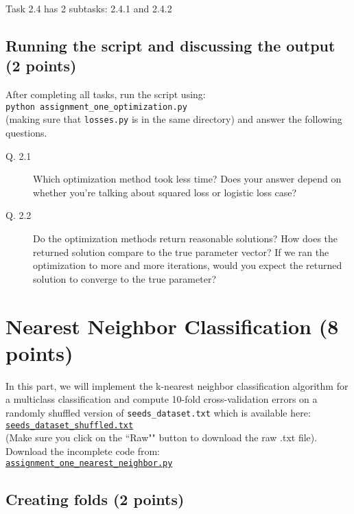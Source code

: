 \documentclass{article}
\begin{document}
Task 2.4 has 2 subtasks: 2.4.1 and 2.4.2

\subsection{Running the script and discussing the output (2 points)}

After completing all tasks, run the script using:\\
{\tt python assignment\_one\_optimization.py} \\
(making sure that {\tt losses.py} is in the same directory) and answer the following questions.

\begin{description}
\item[Q. 2.1]
Which optimization method took less time? Does your answer depend on whether you're talking about squared loss or logistic loss case?
\item[Q. 2.2]
Do the optimization methods return reasonable solutions? How does the returned solution compare to the true parameter vector?
If we ran the optimization to more and more iterations, would you expect the returned solution to converge to the true parameter?
\end{description}


\section{Nearest Neighbor Classification (8 points)}

In this part, we will implement the k-nearest neighbor classification algorithm for a multiclass classification and compute 10-fold cross-validation
errors on a randomly shuffled version of {\tt seeds\_dataset.txt} which is available here:\\
\href{https://github.com/ambujtewari/stats607a-fall2014/blob/master/homeworks/datasets/seeds_dataset_shuffled.txt}{\tt seeds\_dataset\_shuffled.txt} \\
(Make sure you click on the ``Raw"" button to download the raw .txt file).
Download the incomplete code from:\\
\href{https://github.com/ambujtewari/stats607a-fall2014/blob/master/homeworks/assignment_one_nearest_neighbor.py}{\tt assignment\_one\_nearest\_neighbor.py}

\subsection{Creating folds (2 points)}
\end{document}
